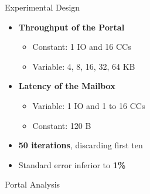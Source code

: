 	\begin{frame}[fragile]{Experimental Design}
		\begin{itemize}
			\item \textbf{Throughput of the Portal}
			\begin{itemize}
				\item Constant: 1 IO and 16 CCs
				\item Variable: 4, 8, 16, 32, 64 KB
			\end{itemize}
			\item \textbf{Latency of the Mailbox}
			\begin{itemize}
				\item Variable: 1 IO and 1 to 16 CCs
				\item Constant: 120 B
			\end{itemize}
			\item \textbf{50 iterations}, discarding first ten
			\item Standard error inferior to \textbf{1\%}
		\end{itemize}

	\end{frame}

	\begin{frame}[fragile]{Portal Analysis}

	\end{frame}

